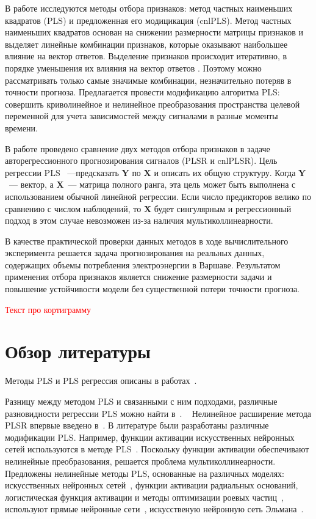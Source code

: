 \documentclass[12pt,fleqn,unicode]{article}
\newcommand{\bY}{\mathbf{Y}}
\newcommand{\bX}{\mathbf{X}}
\begin{document}
В работе исследуются методы отбора признаков: метод частных наименьших квадратов (PLS) \cite{Ng2013} и предложенная его модицикация (cnlPLS).
Метод частных наименьших квадратов основан на снижении размерности матрицы признаков и выделяет линейные комбинации признаков, которые оказывают наибольшее влияние на вектор ответов. Выделение признаков происходит итеративно, в порядке уменьшения их влияния на вектор ответов \cite{Ng2013}. Поэтому можно рассматривать только самые значимые комбинации, незначительно потеряв в точности прогноза. 
Предлагается провести модификацию алгоритма PLS: совершить криволинейное и нелинейное преобразования пространства целевой переменной для учета зависимостей между сигналами в разные моменты времени.


В работе проведено сравнение двух методов отбора признаков в задаче авторегрессионного прогнозирования сигналов (PLSR и cnlPLSR). 
Цель регрессии PLS \cite{Abdi2003}~---предсказать $\bY$ по $\bX$ и описать их общую структуру. Когда $\bY$~--- вектор, а $\bX$~--- матрица полного ранга, эта цель может быть выполнена с использованием обычной линейной регрессии. Если число предикторов велико по сравнению с числом наблюдений, то $\bX$ будет сингулярным и регрессионный подход в этом случае невозможен из-за наличия мультиколлинеарности.

В качестве практической проверки данных методов в ходе вычислительного эксперимента решается задача прогнозирования на реальных данных, содержащих объемы потребления электроэнергии в Варшаве.
Результатом применения отбора признаков является снижение размерности задачи и повышение устойчивости модели без существенной потери точности прогноза.

\textcolor{red}{ Текст про кортиграмму}
 

\newpage
\section{Обзор литературы}
Методы PLS и PLS регрессия описаны в работах~\cite{Geladi1988, Hoskuldsson1988}. 

Разницу между методом PLS и связанными с ним подходами, различные разновидности регрессии PLS можно найти в~\cite{Lehky2014}.
 
Нелинейное расширение метода PLSR впервые введено в~\cite{Frank1990}. В литературе были разработаны различные модификации PLS. Например, функции активации искусственных нейронных сетей используются в методе PLS~\cite{Malthouse1997}. Поскольку функции активации обеспечивают нелинейные преобразования, решается проблема мультиколлинеарности. Предложены нелинейные методы PLS, основанные на различных моделях:  искусственных нейронных сетей~\cite{Mcavovt1992}, функции активации радиальных оснований\cite{Yan2003}, логистическая функция активации и методы оптимизации роевых частиц~\cite{Zhou2007}, используют прямые нейронные сети~\cite{Xuefeng2010}, искусственую нейронную сеть Эльмана~\cite{Bulut2014}.
\end{document}

